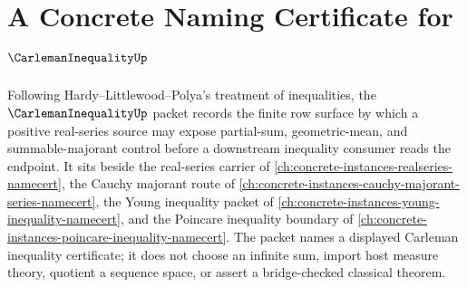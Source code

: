 \chapter{A Concrete Naming Certificate for $\CarlemanInequalityUp$}
\label{ch:concrete-instances-carleman-inequality-namecert}

Following Hardy--Littlewood--Polya's treatment of inequalities, the $\CarlemanInequalityUp$ packet records the finite row surface by which a positive real-series source may expose partial-sum, geometric-mean, and summable-majorant control before a downstream inequality consumer reads the endpoint. It sits beside the real-series carrier of \autoref{ch:concrete-instances-realseries-namecert}, the Cauchy majorant route of \autoref{ch:concrete-instances-cauchy-majorant-series-namecert}, the Young inequality packet of \autoref{ch:concrete-instances-young-inequality-namecert}, and the Poincare inequality boundary of \autoref{ch:concrete-instances-poincare-inequality-namecert}. The packet names a displayed Carleman inequality certificate; it does not choose an infinite sum, import host measure theory, quotient a sequence space, or assert a bridge-checked classical theorem.

